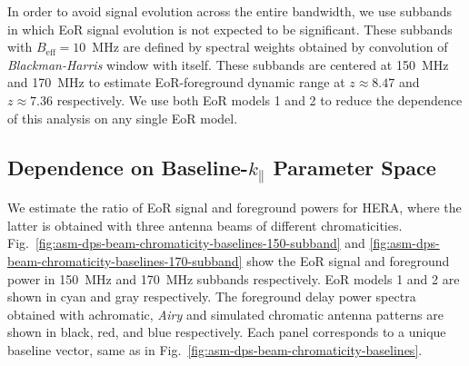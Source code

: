 \documentclass[preprint2,iop,numberedappendix,twocolappendix,appendixfloats]{emulateapj}
\begin{document}
In order to avoid signal evolution across the entire bandwidth, we use subbands in which EoR signal evolution is not expected to be significant. These subbands with $B_\textrm{eff}=10$~MHz are defined by spectral weights obtained by convolution of {\it Blackman-Harris} window with itself. These subbands are centered at 150~MHz and 170~MHz to estimate EoR-foreground dynamic range at $z \approx 8.47$ and $z \approx 7.36$ respectively. We use both EoR models 1 and 2 to reduce the dependence of this analysis on any single EoR model.

\subsection{Dependence on Baseline-$k_\parallel$ Parameter Space}\label{sec:baseline-kprll}

We estimate the ratio of EoR signal and foreground powers for HERA, where the latter is obtained with three antenna beams of different chromaticities. Fig.~\ref{fig:asm-dps-beam-chromaticity-baselines-150-subband} and \ref{fig:asm-dps-beam-chromaticity-baselines-170-subband} show the EoR signal and foreground power in 150~MHz and 170~MHz subbands respectively. EoR models 1 and 2 are shown in cyan and gray respectively. The foreground delay power spectra obtained with achromatic, {\it Airy} and simulated chromatic antenna patterns are shown in black, red, and blue respectively. Each panel corresponds to a unique baseline vector, same as in Fig.~\ref{fig:asm-dps-beam-chromaticity-baselines}. 
\end{document}

